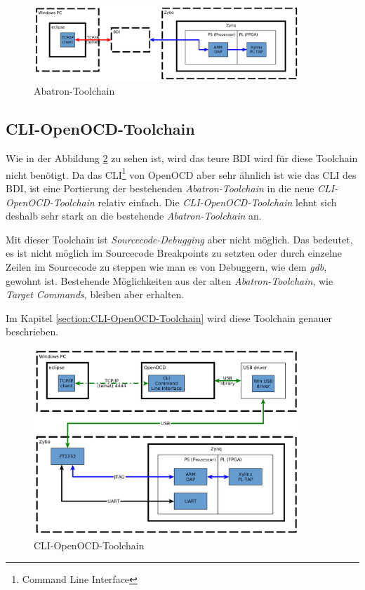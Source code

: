\begin{figure}[htbp]
	\centering
		\includegraphics[width=10cm,height=\textheight,keepaspectratio]{graphs/abatronToolchain.png}
	\caption{Abatron-Toolchain}
	\label{fig:AbatronToolchain}
\end{figure}


\FloatBarrier
\subsection{CLI-OpenOCD-Toolchain}
Wie in der Abbildung \ref{fig:CLIOpenOCDToolchain} zu sehen ist, wird das teure BDI wird für diese Toolchain nicht  benötigt.
Da das CLI\footnote{Command Line Interface} von OpenOCD aber sehr ähnlich ist wie das CLI des BDI, ist eine Portierung der bestehenden \textit{Abatron-Toolchain} in die neue \textit{CLI-OpenOCD-Toolchain} relativ einfach.
Die \textit{CLI-OpenOCD-Toolchain} lehnt sich deshalb sehr stark an die bestehende \textit{Abatron-Toolchain} an.

Mit dieser Toolchain ist \textit{Sourcecode-Debugging} aber nicht möglich.
Das bedeutet, es ist nicht möglich im Sourcecode Breakpoints zu setzten oder durch einzelne Zeilen im Sourcecode zu steppen wie man es von Debuggern, wie dem \textit{gdb}, gewohnt ist.
Bestehende Möglichkeiten aus der alten \textit{Abatron-Toolchain}, wie \textit{Target Commands}, bleiben aber erhalten.

Im Kapitel \ref{section:CLI-OpenOCD-Toolchain} wird diese Toolchain genauer beschrieben.


\begin{figure}[htbp]
	\centering
		\includegraphics[width=10cm,height=\textheight,keepaspectratio]{graphs/CLIOpenOCDToolchain.png}
	\caption{CLI-OpenOCD-Toolchain}
	\label{fig:CLIOpenOCDToolchain}
\end{figure}


